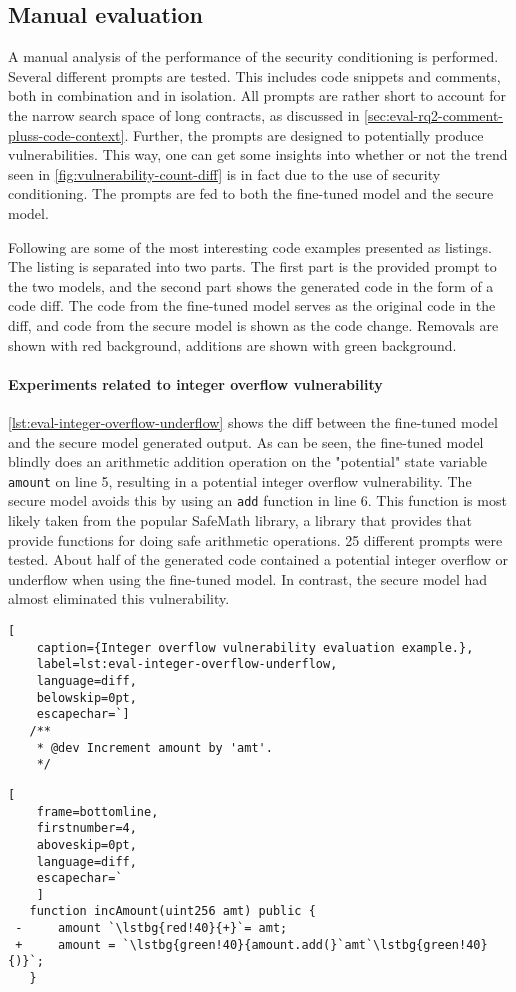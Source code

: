 \subsection{Manual evaluation}
\label{sec:eval-manual}
A manual analysis of the performance of the security conditioning is performed. Several different prompts are tested. This includes code snippets and comments, both in combination and in isolation. All prompts are rather short to account for the narrow search space of long contracts, as discussed in \cref{sec:eval-rq2-comment-pluss-code-context}. Further, the prompts are designed to potentially produce vulnerabilities. This way, one can get some insights into whether or not the trend seen in \cref{fig:vulnerability-count-diff} is in fact due to the use of security conditioning. The prompts are fed to both the fine-tuned model and the secure model.

Following are some of the most interesting code examples presented as listings. The listing is separated into two parts. The first part is the provided prompt to the two models, and the second part shows the generated code in the form of a code diff. The code from the fine-tuned model serves as the original code in the diff, and code from the secure model is shown as the code change. Removals are shown with red background, additions are shown with green background.

\paragraph{Experiments related to integer overflow vulnerability}
\cref{lst:eval-integer-overflow-underflow} shows the diff between the fine-tuned model and the secure model generated output. As can be seen, the fine-tuned model blindly does an arithmetic addition operation on the "potential" state variable \lstinline[language=Solidity]!amount! on line 5, resulting in a potential integer overflow vulnerability. The secure model avoids this by using an \lstinline[language=Solidity]!add! function in line 6. This function is most likely taken from the popular SafeMath library, a library that provides that provide functions for doing safe arithmetic operations. 25 different prompts were tested. About half of the generated code contained a potential integer overflow or underflow when using the fine-tuned model. In contrast, the secure model had almost eliminated this vulnerability.

\begin{lstlisting}[
    caption={Integer overflow vulnerability evaluation example.},
    label=lst:eval-integer-overflow-underflow,
    language=diff,
    belowskip=0pt,
    escapechar=`]
   /**
    * @dev Increment amount by 'amt'.
    */
\end{lstlisting}
\begin{lstlisting}[
    frame=bottomline,
    firstnumber=4,
    aboveskip=0pt,
    language=diff,
    escapechar=`
    ]
   function incAmount(uint256 amt) public {
 -     amount `\lstbg{red!40}{+}`= amt;
 +     amount = `\lstbg{green!40}{amount.add(}`amt`\lstbg{green!40}{)}`;
   }   
\end{lstlisting}

